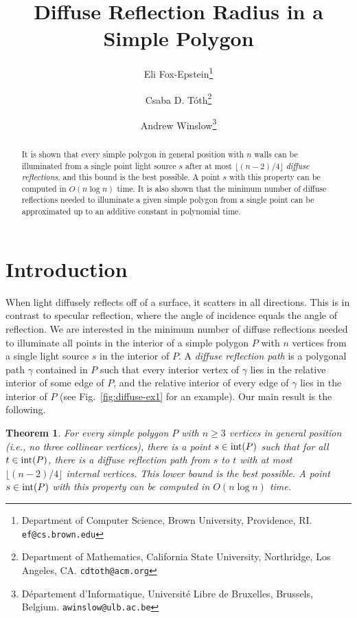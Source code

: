 \documentclass[12pt]{article}
\newcommand{\floor}[1]{{\lfloor #1 \rfloor}}
\newtheorem{theorem}{Theorem}
\begin{document}
\title{Diffuse Reflection Radius in a Simple Polygon}
\author{
  Eli Fox-Epstein\thanks{Department of Computer Science, Brown University, Providence, RI. \texttt{ef@cs.brown.edu}} \and
  Csaba D. T\'oth\thanks{Department of Mathematics, California State University, Northridge, Los Angeles, CA. \texttt{cdtoth@acm.org}} \and
  Andrew Winslow\thanks{D\'{e}partement d'Informatique, Universit\'{e} Libre de Bruxelles, Brussels, Belgium. \texttt{awinslow@ulb.ac.be}}
}\date{}
\maketitle

\begin{abstract}
It is shown that every simple polygon in general position with $n$ walls can be illuminated from a single point light source $s$ after at most $\lfloor (n-2)/4\rfloor$ \emph{diffuse reflections}, and this bound is the best possible. A point $s$ with this property can be computed in $O(n\log n)$ time.
It is also shown that the minimum number of diffuse reflections needed to illuminate a given simple polygon from a single point can be approximated up to an additive constant in polynomial time.
\end{abstract}

\section{Introduction}
When light diffusely reflects off of a surface, it scatters in all directions.
This is in contrast to specular reflection,
  where the angle of incidence equals the angle of reflection.
We are interested in the minimum number of diffuse reflections needed to illuminate all points in the interior of a simple polygon $P$ with $n$ vertices from a single light source $s$ in the interior of $P$.
A \emph{diffuse reflection path} is a polygonal path $\gamma$ contained in $P$ such that every interior vertex of $\gamma$ lies in the relative interior of some edge of $P$, and the relative interior of every edge of $\gamma$ lies in the interior of $P$ (see Fig.~\ref{fig:diffuse-ex1} for an example). Our main result is the following.

\begin{theorem}\label{thm:radius}
For every simple polygon $P$ with $n\geq 3$ vertices in general position (i.e., no three collinear vertices), there is a point $s\in {\rm int}(P)$ such that for all $t \in {\rm int}(P)$,
  there is a diffuse reflection path from $s$ to $t$ with at most $\floor{(n-2)/4}$ internal vertices.
This lower bound is the best possible.
A point $s\in {\rm int}(P)$ with this property can be computed in $O(n \log n)$ time.
\end{theorem}
\end{document}
